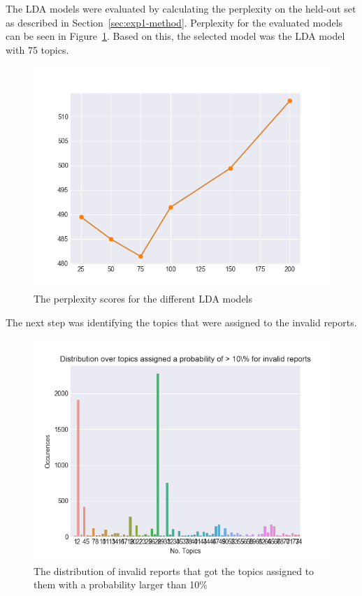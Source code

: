 The LDA models were evaluated by calculating the perplexity on the held-out set as described in Section~\ref{sec:exp1-method}.
Perplexity for the evaluated models can be seen in Figure~\ref{fig:lda-perplexity}.
Based on this, the selected model was the LDA model with 75 topics.

\begin{figure}
    \centering
    \includegraphics[scale=0.8]{figures/lda-perplexity.png}
    \caption{The perplexity scores for the different LDA models}
    \label{fig:lda-perplexity}
\end{figure}

The next step was identifying the topics that were assigned to the invalid reports.

\begin{figure}
    \centering
    \includegraphics[scale=0.8]{figures/distribution_invalid_reports_likely.png}
    \caption{The distribution of invalid reports that got the topics assigned to them with a probability larger than 10\%}
    \label{fig:invalid-reports-topic-dist-likely}
\end{figure}

